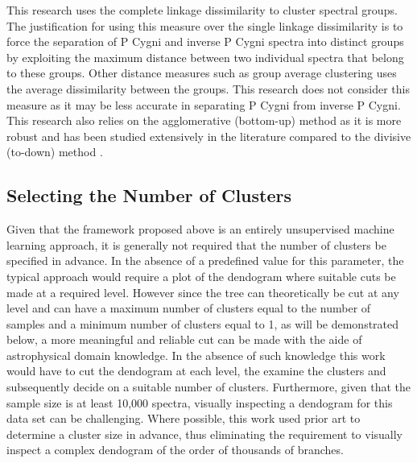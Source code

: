 This research uses the complete linkage dissimilarity to cluster spectral groups. The justification for using this measure over the single linkage dissimilarity is to force the separation of P Cygni and inverse P Cygni spectra into distinct groups by exploiting the maximum distance between two individual spectra that belong to these groups. Other distance measures such as group average clustering uses the average dissimilarity between the groups. This research does not consider this measure as it may be less accurate in separating P Cygni from inverse P Cygni. This research also relies on the agglomerative (bottom-up) method as it is more robust and has been studied extensively in the literature compared to the divisive (to-down) method \cite{hastie2009elements}.

\subsection{Selecting the Number of Clusters}

Given that the framework proposed above is an entirely unsupervised machine learning approach, it is generally not required that the number of clusters be specified in advance. In the absence of a predefined value for this parameter, the typical approach would require a plot of the dendogram where suitable cuts be made at a required level. However since the tree can theoretically be cut at any level and can have a maximum number of clusters equal to the number of samples and a minimum number of clusters equal to 1, as will be demonstrated below, a more meaningful and reliable cut can be made with the aide of astrophysical domain knowledge. In the absence of such knowledge this work would have to cut the dendogram at each level, the examine the clusters and subsequently decide on a suitable number of clusters. Furthermore, given that the sample size is at least 10,000 spectra, visually inspecting a dendogram for this data set can be challenging. Where possible, this work used prior art to determine a cluster size in advance, thus eliminating the requirement to visually inspect a complex dendogram of the order of thousands of branches. 

